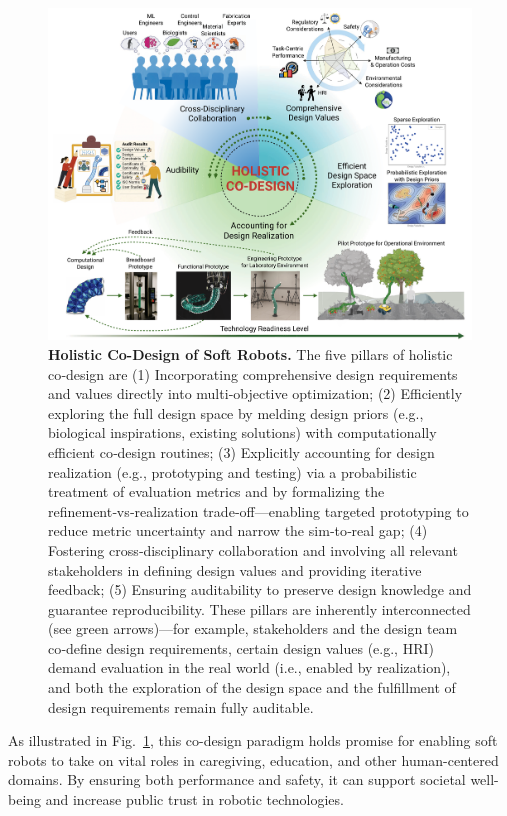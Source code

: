\begin{figure}[tb]
    \centering
    \includegraphics[width=\textwidth]{appendix-holistic-codesign/figures/holistic_codesign_overview_layered_optimized.pdf}
    \caption{
    \textbf{Holistic Co-Design of Soft Robots.}
    The five pillars of holistic co‑design are (1) Incorporating comprehensive design requirements and values directly into multi‑objective optimization; (2) Efficiently exploring the full design space by melding design priors (e.g., biological inspirations, existing solutions) with computationally efficient co‑design routines; (3) Explicitly accounting for design realization (e.g., prototyping and testing) via a probabilistic treatment of evaluation metrics and by formalizing the refinement‑vs‑realization trade‑off—enabling targeted prototyping to reduce metric uncertainty and narrow the sim‑to‑real gap; (4) Fostering cross‑disciplinary collaboration and involving all relevant stakeholders in defining design values and providing iterative feedback; (5) Ensuring auditability to preserve design knowledge and guarantee reproducibility.
    These pillars are inherently interconnected (see green arrows)—for example, stakeholders and the design team co‑define design requirements, certain design values (e.g., \gls{HRI}) demand evaluation in the real world (i.e., enabled by realization), and both the exploration of the design space and the fulfillment of design requirements remain fully auditable.
    }
    \label{fig:apx:holisticcodesign:overview}
\end{figure}

As illustrated in Fig.~\ref{fig:apx:holisticcodesign:overview}, this co-design paradigm holds promise for enabling soft robots to take on vital roles in caregiving, education, and other human-centered domains.
By ensuring both performance and safety, it can support societal well-being and increase public trust in robotic technologies.